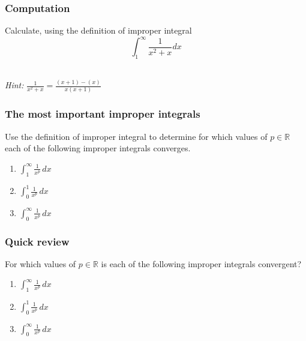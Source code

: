 \documentclass[14pt]{beamer}
\newcommand {\DS} [1] {${\displaystyle #1}$}
\newcommand {\R}{\mathbb{R}}
\begin{document}
\begin{frame}[t]
\frametitle{Computation}

Calculate, using the definition of improper integral
	$$
		\int_{1}^{\infty}  \frac{1}{x^2+x} dx
	$$
\

\emph{Hint:}  \DS{\frac{1}{x^2+x} = \frac{(x+1) - (x)}{x(x+1)}}

\end{frame}
\begin{frame}[t]
\frametitle{The most important improper integrals}

Use the definition of improper integral to determine for which values of \DS{p \in \R} each of the following improper integrals converges.

\begin{enumerate}
	\item  \DS{\int_1^{\infty} \frac{1}{x^p} \, dx }	
	\vfill
	\item \DS{\int_0^1 \frac{1}{x^p} \, dx }	
	\vfill
	\item \DS{\int_0^{\infty} \frac{1}{x^p} \, dx }
	\vfill
\end{enumerate}

\end{frame}
\begin{frame}[t]
\frametitle{Quick review}

For which values of \DS{p \in \R} is each of the following improper integrals convergent?

\begin{enumerate}
	\item \DS{\int_1^{\infty} \frac{1}{x^p} \, dx }
	
	\vfill
	\item \DS{\int_0^1 \frac{1}{x^p} \, dx }
	
	\vfill
	\item \DS{\int_0^{\infty} \frac{1}{x^p} \, dx }
\end{enumerate}

\end{frame}
\end{document}
